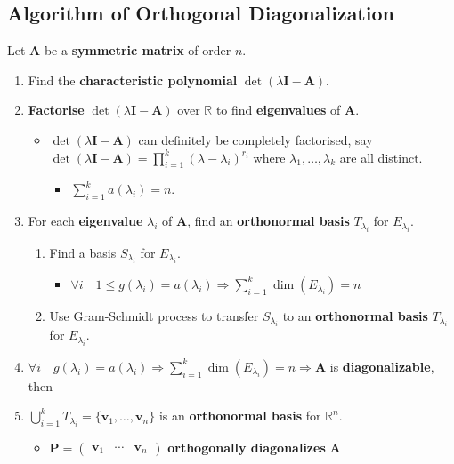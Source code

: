 \documentclass[../ma2001_notes.tex]{subfiles}
\begin{document}
\subsection{Algorithm of Orthogonal Diagonalization}
Let \(\bm{A}\) be a \textbf{symmetric matrix} of order \(n\).
\begin{enumerate}
	\item Find the \textbf{characteristic polynomial} \(\det(\lambda\bm{I}-\bm{A})\).
	\item\textbf{Factorise} \(\det(\lambda\bm{I}-\bm{A})\) over \(\mathbb{R}\) to find \textbf{eigenvalues} of \(\bm{A}\).
	\begin{itemize}
		\item\(\det(\lambda\bm{I}-\bm{A})\) can definitely be completely factorised, say \(\det(\lambda\bm{I}-\bm{A})=\prod\limits_{i=1}^k(\lambda-\lambda_i)^{r_i}\) where \(\lambda_1,\ldots,\lambda_k\) are all distinct.
		\begin{itemize}
			\item\(\sum\limits_{i=1}^ka(\lambda_i)=n\).
		\end{itemize}
	\end{itemize}
	\item For each \textbf{eigenvalue} \(\lambda_i\) of \(\bm{A}\), find an \textbf{orthonormal basis} \(T_{\lambda_i}\) for \(E_{\lambda_i}\).
	\begin{enumerate}
		\item Find a basis \(S_{\lambda_i}\) for \(E_{\lambda_i}\).
		\begin{itemize}
			\item\(\forall i\quad1\leq g(\lambda_i)=a(\lambda_i)\Rightarrow\sum\limits_{i=1}^k\dim(E_{\lambda_i})=n\)
		\end{itemize}
		\item Use Gram-Schmidt process to transfer \(S_{\lambda_i}\) to an \textbf{orthonormal basis} \(T_{\lambda_i}\) for \(E_{\lambda_i}\).
	\end{enumerate}
	\item\(\forall i\quad g(\lambda_i)=a(\lambda_i)\Rightarrow\sum\limits_{i=1}^k\dim(E_{\lambda_i})=n\Rightarrow\bm{A}\) is \textbf{diagonalizable}, then
	\item\(\bigcup\limits_{i=1}^kT_{\lambda_i}=\{\bm{v}_1,\ldots,\bm{v}_n\}\) is an \textbf{orthonormal basis} for \(\mathbb{R}^n\).
	\begin{itemize}
		\item\(\bm{P}=\begin{pmatrix}
			\bm{v}_1 & \cdots & \bm{v}_n
		\end{pmatrix}\) \textbf{orthogonally diagonalizes} \(\bm{A}\)
	\end{itemize}
\end{enumerate}
\end{document}
